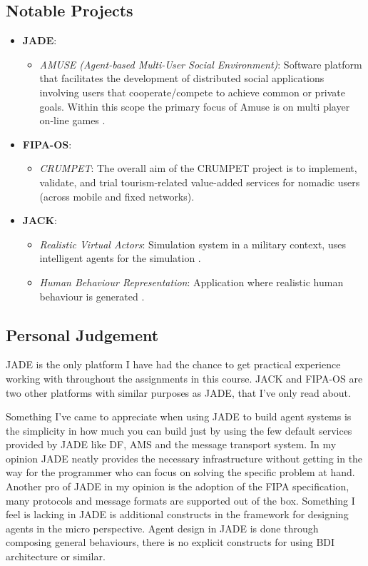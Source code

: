 \documentclass[paper=letter, fontsize=12pt]{article}
\begin{document}
\subsection{Notable Projects}
\begin{itemize}
\item \textbf{JADE}: \\
\begin{itemize}
\item \textit{AMUSE (Agent-based Multi-User Social Environment)}: Software platform that facilitates the development of distributed social applications involving users that cooperate/compete to achieve common or private goals. Within this scope the primary focus of Amuse is on multi player on-line games \citep{jade-3}.
\end{itemize}
\item \textbf{FIPA-OS}: \\
\begin{itemize}
\item \textit{CRUMPET}: The overall aim of the CRUMPET project is to implement, validate, and trial tourism-related value-added services for nomadic users (across mobile and fixed networks). \citep{fipa-os-3}
\end{itemize}
\item \textbf{JACK}: \\
\begin{itemize}
\item \textit{Realistic Virtual Actors}: Simulation system in a military context, uses intelligent agents for the simulation \citep{jack-3}.
\item \textit{Human Behaviour Representation}: Application where realistic human behaviour is generated \citep{jack-3}.
\end{itemize}
\end{itemize}
\subsection{Personal Judgement}
JADE is the only platform I have had the chance to get practical experience working with throughout the assignments in this course. JACK and FIPA-OS are two other platforms with similar purposes as JADE, that I've only read about. 

Something I've came to appreciate when using JADE to build agent systems is the simplicity in how much you can build just by using the few default services provided by JADE like DF, AMS and the message transport system. In my opinion JADE neatly provides the necessary infrastructure without getting in the way for the programmer who can focus on solving the specific problem at hand. Another pro of JADE in my opinion is the adoption of the FIPA specification, many protocols and message formats are supported out of the box. Something I feel is lacking in JADE is additional constructs in the framework for designing agents in the micro perspective. Agent design in JADE is done through composing general behaviours, there is no explicit constructs for using BDI architecture or similar.
\end{document}
